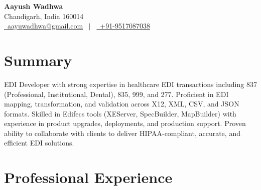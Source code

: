 \documentclass[a4paper,11pt]{article}
\begin{document}
\pagestyle{empty}

\begin{center}
    {\Huge \textbf{Aayush Wadhwa}} \\[5pt]
    Chandigarh, India 160014 \\
    \href{mailto:aayuwadhwa@gmail.com}{\faEnvelope\ aayuwadhwa@gmail.com} \, $|$ \,
    \href{tel:+919517087038}{\faMobile\ +91-9517087038} \\
\end{center}

\section{Summary}
EDI Developer with strong expertise in healthcare EDI transactions including 837 (Professional, Institutional, Dental), 835, 999, and 277. Proficient in EDI mapping, transformation, and validation across X12, XML, CSV, and JSON formats. Skilled in Edifecs tools (XEServer, SpecBuilder, MapBuilder) with experience in product upgrades, deployments, and production support. Proven ability to collaborate with clients to deliver HIPAA-compliant, accurate, and efficient EDI solutions.

\section{Professional Experience}
\end{document}

